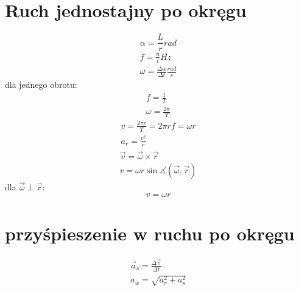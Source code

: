   \section{Ruch jednostajny po okręgu}
    \begin{equation}
      \alpha = \frac Lr \unit{rad}
    \end{equation}
    \begin{gather}
      f = \frac nt \unit{Hz}\\
      \omega = \frac{\Delta\alpha}{\Delta t} \unit{\frac{rad}{s}}
    \end{gather}
    dla jednego obrotu:
    \begin{gather}
      f = \frac 1T\\
      \omega = \frac{2\pi}{T}
    \end{gather}
    \begin{gather}
      v = \frac{2\pi r}{T} = 2\pi rf = \omega r\\
      a_r = \frac{v^2}{r}
    \end{gather}
    \begin{gather}
      \vec v = \vec\omega \times \vec r\\
      v = \omega r\sin\measuredangle(\vec\omega, \vec r)
    \end{gather}
    dla $\vec\omega \perp \vec r$:
    \begin{equation}
      v = \omega r
    \end{equation}
  \section{przyśpieszenie w ruchu po okręgu}
    \begin{gather}
      \vec a_s = \frac{\Delta\vec v}{\Delta t}\\
      a_w = \sqrt{a_r^2 + a_s^2}
    \end{gather}
